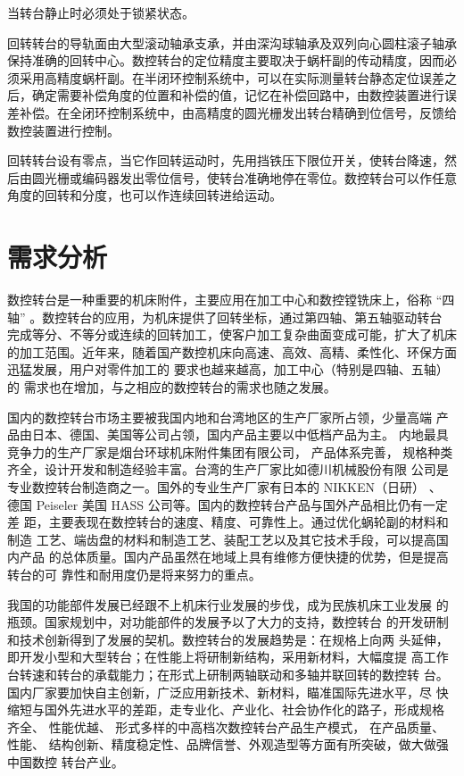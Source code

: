 \documentclass[a4paper,12pt]{article}
\begin{document}
当转台静止时必须处于锁紧状态。

回转转台的导轨面由大型滚动轴承支承，并由深沟球轴承及双列向心圆柱滚子轴承保持准确的回转中心。数控转台的定位精度主要取决于蜗杆副的传动精度，因而必须采用高精度蜗杆副。在半闭环控制系统中，可以在实际测量转台静态定位误差之后，确定需要补偿角度的位置和补偿的值，记忆在补偿回路中，由数控装置进行误差补偿。在全闭环控制系统中，由高精度的圆光栅发出转台精确到位信号，反馈给数控装置进行控制。

回转转台设有零点，当它作回转运动时，先用挡铁压下限位开关，使转台降速，然后由圆光栅或编码器发出零位信号，使转台准确地停在零位。数控转台可以作任意角度的回转和分度，也可以作连续回转进给运动。

\section{需求分析}
数控转台是一种重要的机床附件，主要应用在加工中心和数控镗铣床上，俗称 “四轴” 。数控转台的应用，为机床提供了回转坐标，通过第四轴、第五轴驱动转台 完成等分、不等分或连续的回转加工，使客户加工复杂曲面变成可能，扩大了机床 的加工范围。近年来，随着国产数控机床向高速、高效、高精、柔性化、环保方面 迅猛发展，用户对零件加工的
要求也越来越高，加工中心（特别是四轴、五轴）的 需求也在增加，与之相应的数控转台的需求也随之发展。

国内的数控转台市场主要被我国内地和台湾地区的生产厂家所占领，少量高端 产品由日本、德国、美国等公司占领，国内产品主要以中低档产品为主。 内地最具竞争力的生产厂家是烟台环球机床附件集团有限公司， 产品体系完善， 规格种类齐全，设计开发和制造经验丰富。台湾的生产厂家比如德川机械股份有限 公司是专业数控转台制造商之一。国外的专业生产厂家有日本的 NIKKEN（日研） 、 德国 Peiseler 美国 HASS 公司等。国内的数控转台产品与国外产品相比仍有一定差 距，主要表现在数控转台的速度、精度、可靠性上。通过优化蜗轮副的材料和制造 工艺、端齿盘的材料和制造工艺、装配工艺以及其它技术手段，可以提高国内产品 的总体质量。国内产品虽然在地域上具有维修方便快捷的优势，但是提高转台的可 靠性和耐用度仍是将来努力的重点。

我国的功能部件发展已经跟不上机床行业发展的步伐，成为民族机床工业发展 的瓶颈。国家规划中，对功能部件的发展予以了大力的支持，数控转台 的开发研制和技术创新得到了发展的契机。数控转台的发展趋势是：在规格上向两 头延伸，即开发小型和大型转台；在性能上将研制新结构，采用新材料，大幅度提 高工作台转速和转台的承载能力；在形式上研制两轴联动和多轴并联回转的数控转 台。国内厂家要加快自主创新，广泛应用新技术、新材料，瞄准国际先进水平，尽 快缩短与国外先进水平的差距，走专业化、产业化、社会协作化的路子，形成规格 齐全、 性能优越、 形式多样的中高档次数控转台产品生产模式， 在产品质量、 性能、 结构创新、精度稳定性、品牌信誉、外观造型等方面有所突破，做大做强中国数控 转台产业。
\end{document}
